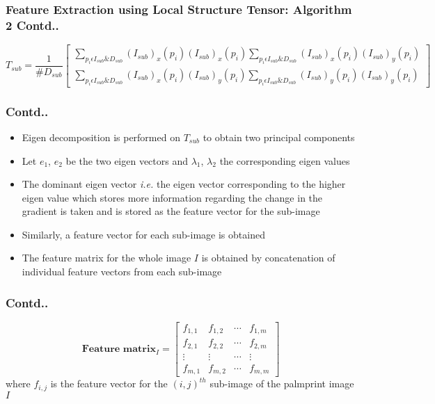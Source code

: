 \documentclass{beamer}
\begin{document}
\begin{frame}
\frametitle{Feature Extraction using Local Structure Tensor: Algorithm 2 Contd..}
\begin{equation}
 T_{sub} = \frac{1}{\# D_{sub}} \begin{bmatrix} \displaystyle\sum_{p_i \epsilon I_{sub} \& D_{sub}}(I_{sub})_x(p_i) (I_{sub})_x(p_i)   \displaystyle\sum_{p_i \epsilon I_{sub} \& D_{sub}}(I_{sub})_x(p_i) (I_{sub})_y(p_i) \\ \displaystyle\sum_{p_i \epsilon I_{sub} \& D_{sub}}(I_{sub})_x(p_i) (I_{sub})_y(p_i)  \displaystyle\sum_{p_i \epsilon I_{sub} \& D_{sub}}(I_{sub})_y(p_i) (I_{sub})_y(p_i) \end{bmatrix}
\end{equation}
\end{frame}

\begin{frame}
	\frametitle{Contd..}
		\begin{itemize}
 			\item Eigen decomposition is performed on $T_{sub}$ to obtain two principal components
 			\item Let $e_1$, $e_2$ be the two eigen vectors and $\lambda_1$, $\lambda_2$ the corresponding eigen values
 			\item The dominant eigen vector \emph{i.e.} the eigen vector corresponding to the higher eigen value which stores more information regarding the change in the gradient is taken and is stored as the feature vector for the sub-image  			\item Similarly, a feature vector for each sub-image is obtained 
 			\item The feature matrix for the whole image $I$ is obtained by concatenation of individual feature vectors from each sub-image
		\end{itemize} 
\end{frame}





\begin{frame}
\frametitle{Contd..}
\begin{equation}
  \textbf{Feature matrix}_{I} = \begin{bmatrix} f_{1,1} & f_{1,2} & \cdots & f_{1,m}\\ f_{2,1} & f_{2,2} & \cdots & f_{2,m}\\ \vdots & \vdots & \cdots & \vdots \\ f_{m,1} & f_{m,2} & \cdots & f_{m,m}\end{bmatrix}
\end{equation}
where $f_{i,j}$ is the feature vector for the $(i,j)^{th}$ sub-image of the palmprint image $I$
\end{frame}
\end{document}
